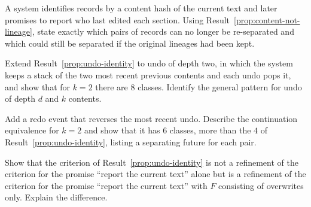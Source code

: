 \begin{exercise}
A system identifies records by a content hash of the current text and later promises to report who last edited each section. Using Result~\ref{prop:content-not-lineage}, state exactly which pairs of records can no longer be re-separated and which could still be separated if the original lineages had been kept.
\end{exercise}


\begin{exercise}
Extend Result~\ref{prop:undo-identity} to undo of depth two, in which the system keeps a stack of the two most recent previous contents and each undo pops it, and show that for $k=2$ there are $8$ classes. Identify the general pattern for undo of depth $d$ and $k$ contents.\label{ex:undo-depth}
\end{exercise}

\begin{exercise}
Add a $\mathrm{redo}$ event that reverses the most recent undo. Describe the continuation equivalence for $k=2$ and show that it has $6$ classes, more than the $4$ of Result~\ref{prop:undo-identity}, listing a separating future for each pair.\label{ex:redo}
\end{exercise}

\begin{exercise}
Show that the criterion of Result~\ref{prop:undo-identity} is not a refinement of the criterion for the promise ``report the current text'' alone but is a refinement of the criterion for the promise ``report the current text'' with $F$ consisting of overwrites only. Explain the difference.
\end{exercise}

